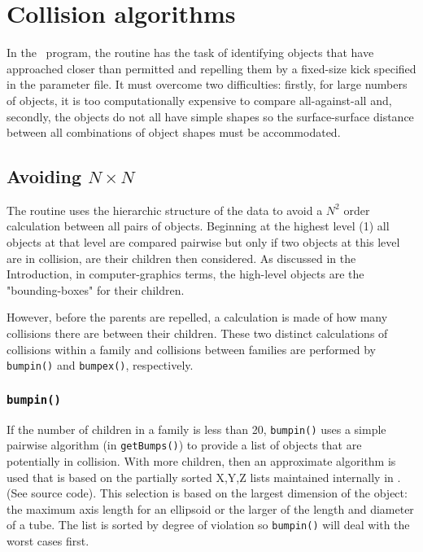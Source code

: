\section{Collision algorithms}

In the \NAME\ program, the
 routine has the task of identifying objects that have approached closer
than permitted and repelling them by a fixed-size kick specified in the parameter file.
It must overcome two difficulties:  firstly, for large numbers of objects, it is too
computationally expensive to compare all-against-all and, secondly, the objects do not
all have simple shapes so the surface-surface distance between all combinations of
object shapes must be accommodated.

\subsection{Avoiding $N \times N$}

The  routine uses the hierarchic structure of the data to avoid a $N^2$
order calculation between all pairs of objects.  Beginning at the highest level (1)
all objects at that level are compared pairwise but only if two objects at this level
are in collision, are their children then considered. 
As discussed in the Introduction, in computer-graphics terms,
the high-level objects are the "bounding-boxes" for their children. 

However, before the parents are repelled, a calculation is made of how many collisions
there are between their children.  These two distinct calculations of collisions
within a family and collisions between families are performed by {\tt bumpin()}
and {\tt bumpex()}, respectively.

\subsubsection{{\tt bumpin()}}

If the number of children in a family is less than 20, {\tt bumpin()}
uses a simple pairwise algorithm (in {\tt getBumps()}) to provide a list of objects that
are potentially in collision.  With more children, then an approximate algorithm
is used that is based on the partially sorted X,Y,Z lists maintained internally in \NAME . (See
source code).  This selection is based on the largest dimension of the object:  the maximum
axis length for an ellipsoid or the larger of the length and diameter of a tube.  The list
is sorted by degree of violation so {\tt bumpin()} will deal with the worst cases first.

